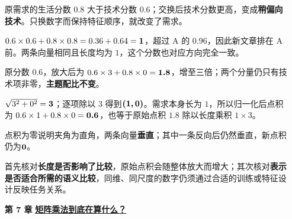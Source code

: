 \begin{enumerate}[leftmargin=5.4em,labelsep=.7em,itemsep=9pt]
原需求的生活分数 $0.8$ 大于技术分数 $0.6$；交换后技术分数更高，变成\textbf{稍偏向技术}。只换数字而保持特征顺序，就改变了需求。
\par{}$0.6\times0.6+0.8\times0.8=0.36+0.64=\answerresult{1}$，超过 A 的 $0.96$，因此新文章排在 A 前。两条向量相同且长度均为 $1$，这个分数也对应方向完全一致。
\par{}原分数 $0.6$，放大后为 $0.6\times3+0.8\times0=\answerresult{1.8}$，增至三倍；两个分量仍只有技术项非零，\textbf{主题配比不变}。
\par{}$\sqrt{3^2+0^2}=\answerresult{3}$；逐项除以 $3$ 得到$\answerresult{(1,0)}$。需求本身长为 $1$，所以归一化后点积为 $0.6\times1+0.8\times0=\answerresult{0.6}$，也等于原始点积 $1.8$ 除以长度乘积 $1\times3$。
\par{}点积为零说明夹角为直角，两条向量\textbf{垂直}；其中一条反向后仍然垂直，新点积仍为$\answerresult{0}$。
\par{}首先核对\textbf{长度是否影响了比较}，原始点积会随整体放大而增大；其次核对\textbf{表示是否适合所需的语义比较}，同维、同尺度的数字仍须通过合适的训练或特征设计反映任务关系。
\par{}
\item[\textbf{第 7 章}] \label{answer:matrix-multiplication}\textbf{\hyperref[check:matrix-multiplication]{矩阵乘法到底在算什么？}}\par\nobreak
{}
\end{enumerate}
